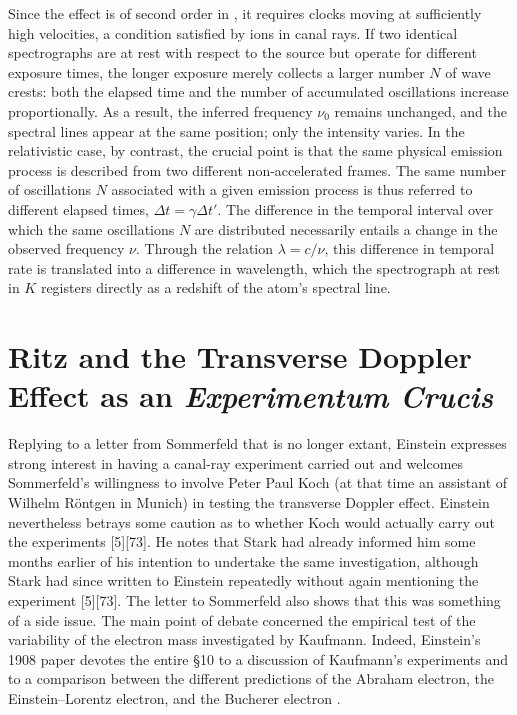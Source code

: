 \documentclass[pdflatex]{sn-jnl}
\newcommand{\tDe}{transverse Doppler effect\xspace}
\begin{document}
Since the effect is of second order in \betafactorh, it requires clocks moving at sufficiently high velocities, a condition satisfied by ions in canal rays. If two identical spectrographs are at rest with respect to the source but operate for different exposure times, the longer exposure merely collects a larger number $N$ of wave crests: both the elapsed time and the number of accumulated oscillations increase proportionally. As a result, the inferred frequency $\nu_0$ remains unchanged, and the spectral lines appear at the same position; only the intensity varies. In the relativistic case, by contrast, the crucial point is that the same physical emission process is described from two different non-accelerated frames. The same number of oscillations $N$ associated with a given emission process is thus referred to different elapsed times, $\Delta t=\gamma \Delta t'$. The difference in the temporal interval over which the same oscillations $N$ are distributed necessarily entails a change in the observed frequency $\nu$. Through the relation $\lambda = c/\nu$, this difference in temporal rate is translated into a difference in wavelength, which the spectrograph at rest in $K$ registers directly as a redshift of the atom’s spectral line.


\section{Ritz and the Transverse Doppler Effect as an \emph{Experimentum Crucis}}
%
Replying to a letter from Sommerfeld that is no longer extant, Einstein expresses strong interest in having a canal-ray experiment carried out and welcomes Sommerfeld’s willingness to involve Peter Paul Koch (at that time an assistant of Wilhelm Röntgen in Munich) in testing the \tDe. Einstein nevertheless betrays some caution as to whether Koch would actually carry out the experiments [5][73]. He notes that Stark had already informed him some months earlier of his intention to undertake the same investigation, although Stark had since written to Einstein repeatedly without again mentioning the experiment [5][73]. The letter to Sommerfeld also shows that this was something of a side issue. The main point of debate concerned the empirical test of the variability of the electron mass investigated by Kaufmann. Indeed, Einstein’s 1908 paper devotes the entire \S10 to a discussion of Kaufmann’s experiments and to a comparison between the different predictions of the Abraham electron, the Einstein--Lorentz electron, and the Bucherer electron \citep{Walter2018}.
\end{document}
